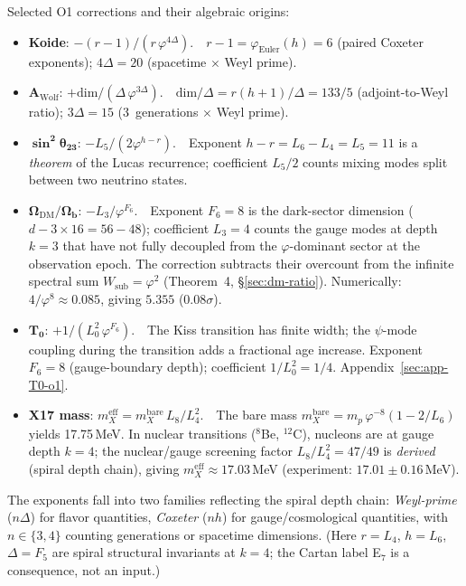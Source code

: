\documentclass[12pt,a4paper]{article}
\begin{document}
Selected O1 corrections and their algebraic origins:
\begin{itemize}
\item \textbf{Koide}: $-(r{-}1)/(r\,\varphi^{4\Delta})$.\ \  $r{-}1 = \varphi_{\text{Euler}}(h) = 6$ (paired Coxeter exponents); $4\Delta = 20$ (spacetime $\times$ Weyl prime).
\item $\boldsymbol{A_{\mathrm{Wolf}}}$: $+\mathrm{dim}/(\Delta\,\varphi^{3\Delta})$.\ \  $\mathrm{dim}/\Delta = r(h{+}1)/\Delta = 133/5$ (adjoint-to-Weyl ratio); $3\Delta = 15$ (3~generations $\times$ Weyl prime).
\item $\boldsymbol{\sin^2\theta_{23}}$: $-L_5/(2\varphi^{h-r})$.\ \  Exponent $h - r = L_6 - L_4 = L_5 = 11$ is a \emph{theorem} of the Lucas recurrence; coefficient $L_5/2$ counts mixing modes split between two neutrino states.
\item $\boldsymbol{\Omega_{\mathrm{DM}}/\Omega_b}$: $-L_3/\varphi^{F_6}$.\ \  Exponent $F_6 = 8$ is the dark-sector dimension ($d - 3\times 16 = 56 - 48$); coefficient $L_3 = 4$ counts the gauge modes at depth $k = 3$ that have not fully decoupled from the $\varphi$-dominant sector at the observation epoch. The correction subtracts their overcount from the infinite spectral sum $W_{\mathrm{sub}} = \varphi^2$ (Theorem~4, \S\ref{sec:dm-ratio}). Numerically: $4/\varphi^8 \approx 0.085$, giving $5.355$ ($0.08\sigma$).
\item $\boldsymbol{T_0}$: $+1/(L_0^2\,\varphi^{F_6})$.\ \  The Kiss transition has finite width; the $\psi$-mode coupling during the transition adds a fractional age increase. Exponent $F_6 = 8$ (gauge-boundary depth); coefficient $1/L_0^2 = 1/4$. Appendix~\ref{sec:app-T0-o1}.
\item \textbf{X17 mass}: $m_X^{\mathrm{eff}} = m_X^{\mathrm{bare}}\,L_8/L_4^2$.\ \  The bare mass $m_X^{\mathrm{bare}} = m_p\,\varphi^{-8}(1 - 2/L_6)$ yields 17.75\,MeV. In nuclear transitions ($^8$Be, $^{12}$C), nucleons are at gauge depth $k=4$; the nuclear/gauge screening factor $L_8/L_4^2 = 47/49$ is \emph{derived} (spiral depth chain), giving $m_X^{\mathrm{eff}} \approx 17.03$\,MeV (experiment: $17.01 \pm 0.16$\,MeV).
\end{itemize}
The exponents fall into two families reflecting the spiral depth chain: \emph{Weyl-prime} ($n\Delta$) for flavor quantities, \emph{Coxeter} ($nh$) for gauge/cosmological quantities, with $n \in \{3,4\}$ counting generations or spacetime dimensions. (Here $r = L_4$, $h = L_6$, $\Delta = F_5$ are spiral structural invariants at $k = 4$; the Cartan label E$_7$ is a consequence, not an input.)
\end{document}
